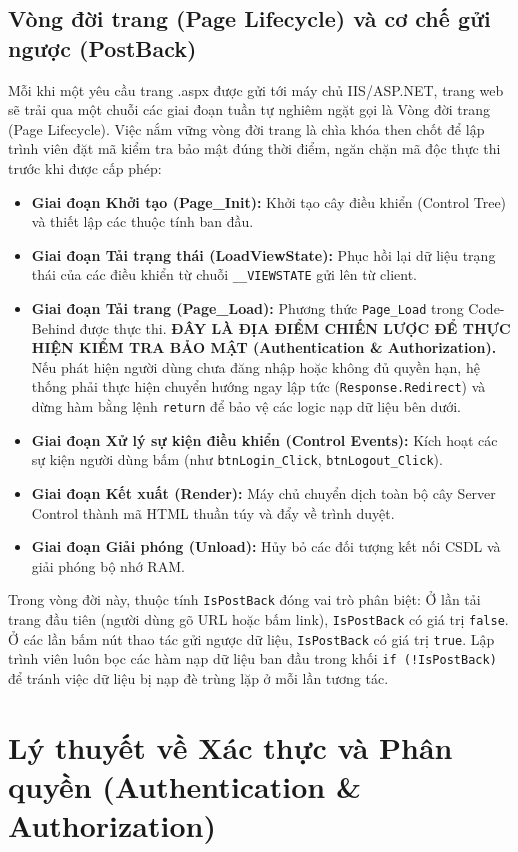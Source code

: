\documentclass[12pt,a4paper]{report}
\begin{document}
\subsection{Vòng đời trang (Page Lifecycle) và cơ chế gửi ngược (PostBack)}
Mỗi khi một yêu cầu trang .aspx được gửi tới máy chủ IIS/ASP.NET, trang web sẽ trải qua một chuỗi các giai đoạn tuần tự nghiêm ngặt gọi là Vòng đời trang (Page Lifecycle). Việc nắm vững vòng đời trang là chìa khóa then chốt để lập trình viên đặt mã kiểm tra bảo mật đúng thời điểm, ngăn chặn mã độc thực thi trước khi được cấp phép:
\begin{itemize}
    \item \textbf{Giai đoạn Khởi tạo (Page\_Init):} Khởi tạo cây điều khiển (Control Tree) và thiết lập các thuộc tính ban đầu.
    \item \textbf{Giai đoạn Tải trạng thái (LoadViewState):} Phục hồi lại dữ liệu trạng thái của các điều khiển từ chuỗi \texttt{\_\_VIEWSTATE} gửi lên từ client.
    \item \textbf{Giai đoạn Tải trang (Page\_Load):} Phương thức \texttt{Page\_Load} trong Code-Behind được thực thi. \textbf{ĐÂY LÀ ĐỊA ĐIỂM CHIẾN LƯỢC ĐỂ THỰC HIỆN KIỂM TRA BẢO MẬT (Authentication \& Authorization).} Nếu phát hiện người dùng chưa đăng nhập hoặc không đủ quyền hạn, hệ thống phải thực hiện chuyển hướng ngay lập tức (\texttt{Response.Redirect}) và dừng hàm bằng lệnh \texttt{return} để bảo vệ các logic nạp dữ liệu bên dưới.
    \item \textbf{Giai đoạn Xử lý sự kiện điều khiển (Control Events):} Kích hoạt các sự kiện người dùng bấm (như \texttt{btnLogin\_Click}, \texttt{btnLogout\_Click}).
    \item \textbf{Giai đoạn Kết xuất (Render):} Máy chủ chuyển dịch toàn bộ cây Server Control thành mã HTML thuần túy và đẩy về trình duyệt.
    \item \textbf{Giai đoạn Giải phóng (Unload):} Hủy bỏ các đối tượng kết nối CSDL và giải phóng bộ nhớ RAM.
\end{itemize}

Trong vòng đời này, thuộc tính \texttt{IsPostBack} đóng vai trò phân biệt: Ở lần tải trang đầu tiên (người dùng gõ URL hoặc bấm link), \texttt{IsPostBack} có giá trị \texttt{false}. Ở các lần bấm nút thao tác gửi ngược dữ liệu, \texttt{IsPostBack} có giá trị \texttt{true}. Lập trình viên luôn bọc các hàm nạp dữ liệu ban đầu trong khối \texttt{if (!IsPostBack)} để tránh việc dữ liệu bị nạp đè trùng lặp ở mỗi lần tương tác.

\section{Lý thuyết về Xác thực và Phân quyền (Authentication \& Authorization)}
\end{document}
